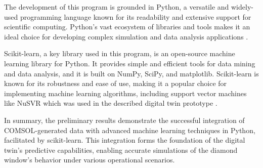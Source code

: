 The development of this program is grounded in Python, a versatile and
widely-used programming language known for its readability and extensive
support for scientific computing. Python's vast ecosystem of libraries and
tools makes it an ideal choice for developing complex simulation and data
analysis applications \cite{python2021python}.

Scikit-learn, a key library used in this program, is an open-source machine
learning library for Python. It provides simple and efficient tools for data
mining and data analysis, and it is built on NumPy, SciPy, and matplotlib.
Scikit-learn is known for its robustness and ease of use, making it a popular
choice for implementing machine learning algorithms, including support vector
machines like NuSVR which was used in the described digital twin prototype
\cite{kramer2016scikit}.

In summary, the preliminary results demonstrate the successful integration of
COMSOL-generated data with advanced machine learning techniques in Python,
facilitated by scikit-learn. This integration forms the foundation of the
digital twin's predictive capabilities, enabling accurate simulations of the
diamond window's behavior under various operational scenarios.
